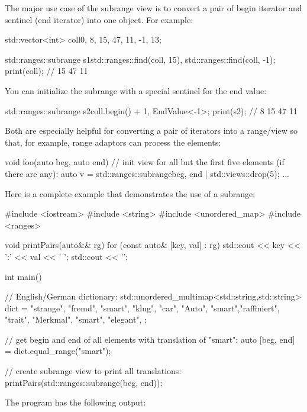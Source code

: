The major use case of the subrange view is to convert a pair of begin iterator and sentinel (end iterator) into one object. For example:

\begin{cpp}
std::vector<int> coll{0, 8, 15, 47, 11, -1, 13};

std::ranges::subrange s1{std::ranges::find(coll, 15),
						std::ranges::find(coll, -1)};
print(coll); // 15 47 11
\end{cpp}

You can initialize the subrange with a special sentinel for the end value:

\begin{cpp}
std::ranges::subrange s2{coll.begin() + 1, EndValue<-1>{}};
print(s2); // 8 15 47 11
\end{cpp}

Both are especially helpful for converting a pair of iterators into a range/view so that, for example, range adaptors can process the elements:

\begin{cpp}
void foo(auto beg, auto end)
{
	// init view for all but the first five elements (if there are any):
	auto v = std::ranges::subrange{beg, end} | std::views::drop(5);
	...
}
\end{cpp}

Here is a complete example that demonstrates the use of a subrange:


\begin{cpp}
#include <iostream>
#include <string>
#include <unordered_map>
#include <ranges>

void printPairs(auto&& rg)
{
	for (const auto& [key, val] : rg) {
		std::cout << key << ':' << val << ' ';
	}
	std::cout << '\n';
}

int main()
{
	// English/German dictionary:
	std::unordered_multimap<std::string,std::string> dict = {
		{"strange", "fremd"},
		{"smart", "klug"},
		{"car", "Auto"},
		{"smart","raffiniert"},
		{"trait", "Merkmal"},
		{"smart", "elegant"},
	};
	
	// get begin and end of all elements with translation of "smart":
	auto [beg, end] = dict.equal_range("smart");
	
	// create subrange view to print all translations:
	printPairs(std::ranges::subrange(beg, end));
}
\end{cpp}

The program has the following output:

